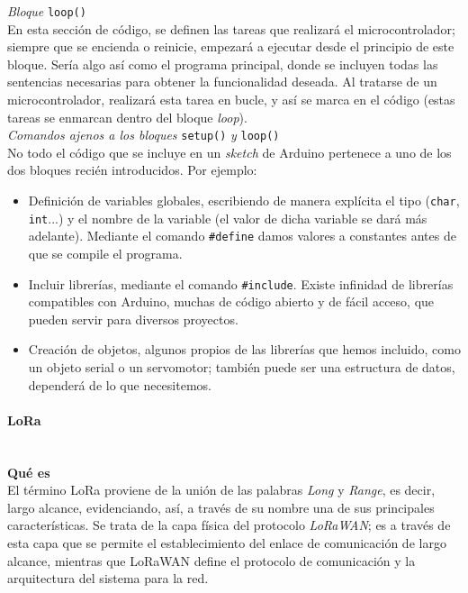\documentclass[12pt]{article}
\newcommand{\subsubsubsection}[1]{\paragraph{#1}\mbox{}\\}
\begin{document}
	\noindent \textit{Bloque} \texttt{loop()} \\
	
	\noindent En esta sección de código, se definen las tareas que realizará el microcontrolador; siempre que se encienda o reinicie, empezará a ejecutar desde el principio de este bloque. Sería algo así como el programa principal, donde se incluyen todas las sentencias necesarias para obtener la funcionalidad deseada. Al tratarse de un microcontrolador, realizará esta tarea en bucle, y así se marca en el código (estas tareas se enmarcan dentro del bloque \textit{loop}). \\
	
	\noindent \textit{Comandos ajenos a los bloques} \texttt{setup()} \textit{y} \texttt{loop()}\\
	
	\noindent No todo el código que se incluye en un \textit{sketch}  de Arduino pertenece a uno de los dos bloques recién introducidos. Por ejemplo:
	
	\begin{itemize}
		\item Definición de variables globales, escribiendo de manera explícita el tipo (\texttt{char}, \texttt{int}...) y el nombre de la variable (el valor de dicha variable se dará más adelante). Mediante el comando \texttt{\#define} damos valores a constantes antes de que se compile el programa.
		\item Incluir librerías, mediante el comando \texttt{\#include}. Existe infinidad de librerías compatibles con Arduino, muchas de código abierto y de fácil acceso, que pueden servir para diversos proyectos. 
		\item Creación de objetos, algunos propios de las librerías que hemos incluido, como un objeto serial o un servomotor; también puede ser una estructura de datos, dependerá de lo que necesitemos.
	\end{itemize} 
	
	\subsubsubsection{LoRa}
	
	\noindent \textbf{Qué es}\\
	
	\noindent El término LoRa proviene de la unión de las palabras \textit{Long} y \textit{Range}, es decir, largo alcance, evidenciando, así, a través de su nombre una de sus principales características. Se trata de la capa física del protocolo \textit{LoRaWAN}; es a través de esta capa que se permite el establecimiento del enlace de comunicación de largo alcance, mientras que LoRaWAN define el protocolo de comunicación y la arquitectura del sistema para la red. \\
	
\end{document}
